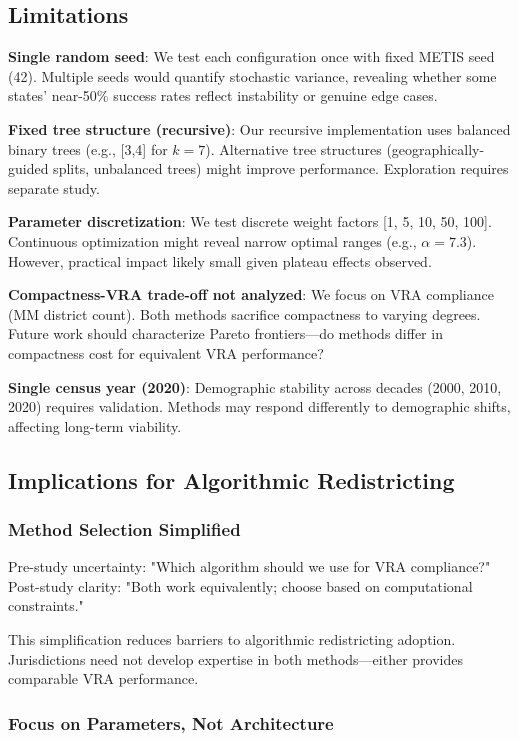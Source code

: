 \subsection{Limitations}

\textbf{Single random seed}: We test each configuration once with fixed METIS seed (42). Multiple seeds would quantify stochastic variance, revealing whether some states' near-50\% success rates reflect instability or genuine edge cases.

\textbf{Fixed tree structure (recursive)}: Our recursive implementation uses balanced binary trees (e.g., [3,4] for $k=7$). Alternative tree structures (geographically-guided splits, unbalanced trees) might improve performance. Exploration requires separate study.

\textbf{Parameter discretization}: We test discrete weight factors [1, 5, 10, 50, 100]. Continuous optimization might reveal narrow optimal ranges (e.g., $\alpha=7.3$). However, practical impact likely small given plateau effects observed.

\textbf{Compactness-VRA trade-off not analyzed}: We focus on VRA compliance (MM district count). Both methods sacrifice compactness to varying degrees. Future work should characterize Pareto frontiers—do methods differ in compactness cost for equivalent VRA performance?

\textbf{Single census year (2020)}: Demographic stability across decades (2000, 2010, 2020) requires validation. Methods may respond differently to demographic shifts, affecting long-term viability.

\subsection{Implications for Algorithmic Redistricting}

\subsubsection{Method Selection Simplified}

Pre-study uncertainty: "Which algorithm should we use for VRA compliance?" Post-study clarity: "Both work equivalently; choose based on computational constraints."

This simplification reduces barriers to algorithmic redistricting adoption. Jurisdictions need not develop expertise in both methods—either provides comparable VRA performance.

\subsubsection{Focus on Parameters, Not Architecture}

